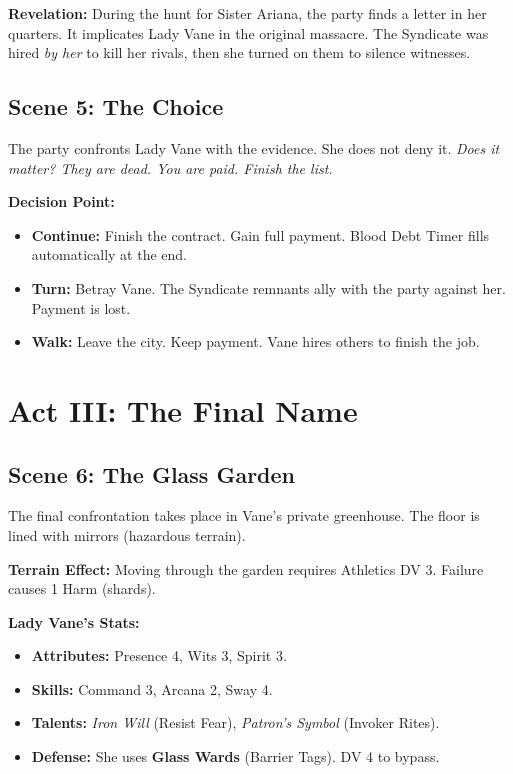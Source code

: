 \documentclass[12pt]{book}
\begin{document}
\textbf{Revelation:} During the hunt for Sister Ariana, the party finds a letter in her quarters. It implicates Lady Vane in the original massacre. The Syndicate was hired \textit{by her} to kill her rivals, then she turned on them to silence witnesses.

\section{Scene 5: The Choice}

The party confronts Lady Vane with the evidence. She does not deny it. \textit{Does it matter? They are dead. You are paid. Finish the list.}

\textbf{Decision Point:}
\begin{itemize}
    \item \textbf{Continue:} Finish the contract. Gain full payment. Blood Debt Timer fills automatically at the end.
    \item \textbf{Turn:} Betray Vane. The Syndicate remnants ally with the party against her. Payment is lost.
    \item \textbf{Walk:} Leave the city. Keep payment. Vane hires others to finish the job.
\end{itemize}

\chapter{Act III: The Final Name}

\section{Scene 6: The Glass Garden}

The final confrontation takes place in Vane's private greenhouse. The floor is lined with mirrors (hazardous terrain).

\textbf{Terrain Effect:} Moving through the garden requires Athletics DV 3. Failure causes 1 Harm (shards).

\textbf{Lady Vane's Stats:}
\begin{itemize}
    \item \textbf{Attributes:} Presence 4, Wits 3, Spirit 3.
    \item \textbf{Skills:} Command 3, Arcana 2, Sway 4.
    \item \textbf{Talents:} \textit{Iron Will} (Resist Fear), \textit{Patron's Symbol} (Invoker Rites).
    \item \textbf{Defense:} She uses \textbf{Glass Wards} (Barrier Tags). DV 4 to bypass.
\end{itemize}
\end{document}
